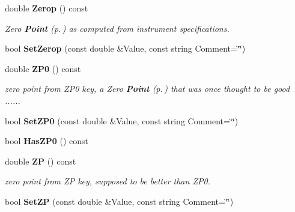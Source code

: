 \begin{CompactItemize}
\item 
{}
double {\bf Zerop} () const\label{class_reducedimage_a70}

\begin{CompactList}\small\item\em Zero {\bf Point} {\rm (p.\,\pageref{class_point})} as computed from instrument specifications.\item\end{CompactList}\item 
{}
bool {\bf Set\-Zerop} (const double \&Value, const string Comment=\char`\"{}\char`\"{})\label{class_reducedimage_a71}

\item 
{}
double {\bf ZP0} () const\label{class_reducedimage_a72}

\begin{CompactList}\small\item\em zero point from ZP0 key, a Zero {\bf Point} {\rm (p.\,\pageref{class_point})} that was once thought to be good ......\item\end{CompactList}\item 
{}
bool {\bf Set\-ZP0} (const double \&Value, const string Comment=\char`\"{}\char`\"{})\label{class_reducedimage_a73}

\item 
{}
bool {\bf Has\-ZP0} () const\label{class_reducedimage_a74}

\item 
{}
double {\bf ZP} () const\label{class_reducedimage_a75}

\begin{CompactList}\small\item\em zero point from ZP key, supposed to be better than ZP0.\item\end{CompactList}\item 
{}
bool {\bf Set\-ZP} (const double \&Value, const string Comment=\char`\"{}\char`\"{})\label{class_reducedimage_a76}


\end{CompactItemize}
